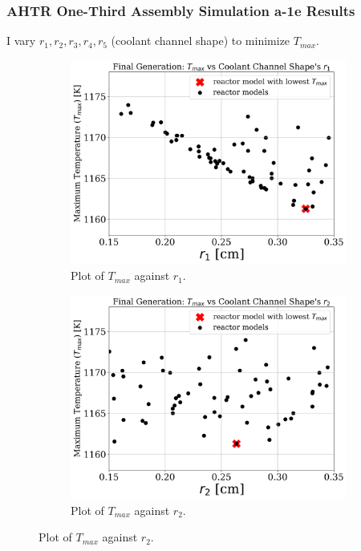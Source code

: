 \begin{frame}
    \frametitle{AHTR One-Third Assembly Simulation a-1e Results}
    I vary $r_1, r_2, r_3, r_4, r_5$ (coolant channel shape)
    to minimize $T_{max}$. 
    \begin{figure}
        \centering
        \begin{subfigure}{0.3\textwidth}
            \includegraphics[width=\linewidth]{figures/a-1e-r1-pres.png}
            \caption{Plot of $T_{max}$ against $r_1$.}
            \label{fig:a-1e-r1} 
        \end{subfigure}
        \begin{subfigure}{0.3\textwidth}
            \includegraphics[width=\linewidth]{figures/a-1e-r2-pres.png}
            \caption{Plot of $T_{max}$ against $r_2$.}

\end{subfigure}
\end{figure}
\end{frame}
